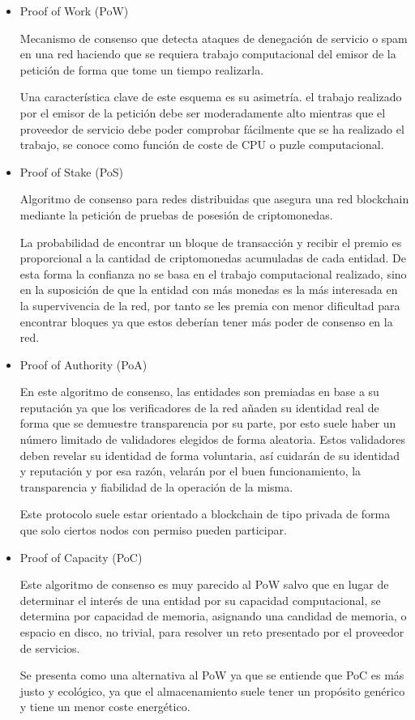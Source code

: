 \documentclass[12pt]{report}
\begin{document}
\begin{itemize}
\item Proof of Work (PoW)

	Mecanismo de consenso que detecta ataques de denegación de servicio o spam en una red haciendo que se requiera trabajo computacional del emisor de la petición de forma que tome un tiempo realizarla.
	 
	 Una característica clave de este esquema es su asimetría. el trabajo realizado por el emisor de la petición debe ser moderadamente alto mientras que el proveedor de servicio debe poder comprobar fácilmente que se ha realizado el trabajo, se conoce como función de coste de CPU o puzle computacional.
	  
\item Proof of Stake (PoS) 

	Algoritmo de consenso para redes distribuidas que asegura una red blockchain mediante la petición de pruebas de posesión de criptomonedas.
	
	La probabilidad de encontrar un bloque de transacción y recibir el premio es proporcional a la cantidad de criptomonedas acumuladas de cada entidad. De esta forma la confianza no se basa en el trabajo computacional realizado, sino en la suposición de que la entidad con más monedas es la más interesada en la supervivencia de la red, por tanto se les premia con menor dificultad para encontrar bloques ya que estos deberían tener más poder de consenso en la red.
	
\item Proof of Authority (PoA)

	En este algoritmo de consenso, las entidades son premiadas en base a su reputación ya que los verificadores de la red añaden su identidad real de forma que se demuestre transparencia por su parte, por esto suele haber un número limitado de validadores elegidos de forma aleatoria. Estos validadores deben revelar su identidad de forma voluntaria, así cuidarán de su identidad y reputación y por esa razón, velarán por el buen funcionamiento, la transparencia y fiabilidad de la operación de la misma.
	
	Este protocolo suele estar orientado a blockchain de tipo privada de forma que solo ciertos nodos con permiso pueden participar.

\item Proof of Capacity (PoC)

	Este algoritmo de consenso es muy parecido al PoW salvo que en lugar de determinar el interés de una entidad por su capacidad computacional, se determina por capacidad de memoria, asignando una candidad de memoria, o espacio en disco, no trivial, para resolver un reto presentado por el proveedor de servicios.
	
	Se presenta como una alternativa al PoW ya que se entiende que PoC es más justo y ecológico, ya que el almacenamiento suele tener un propósito genérico y tiene un menor coste energético.
	
\end{itemize}	 
\end{document}
